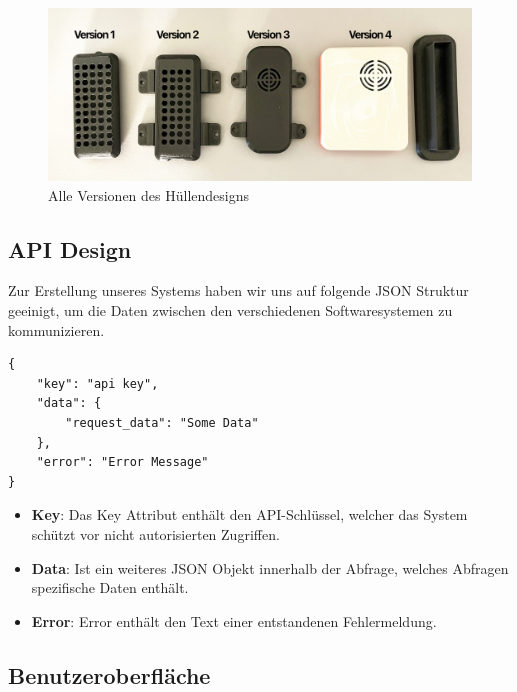 \documentclass[../main.tex]{subfiles}
\begin{document}
\begin{figure}[!ht]
    \includegraphics[width=\linewidth]{images/huellen_versionen.png}
    \caption{Alle Versionen des Hüllendesigns}
    \centering
\end{figure}

\subsection{API Design} \label{JSON-API}

Zur Erstellung unseres Systems haben wir uns auf folgende JSON Struktur geeinigt, um die Daten zwischen den verschiedenen Softwaresystemen zu kommunizieren. 

\begin{lstlisting}
{
    "key": "api key",
    "data": {
        "request_data": "Some Data"
    },
    "error": "Error Message"
}
\end{lstlisting}

\begin{itemize}
  \item\textbf{Key}: Das Key Attribut enthält den API-Schlüssel, welcher das System schützt vor nicht autorisierten Zugriffen.
  \item\textbf{Data}: Ist ein weiteres JSON Objekt innerhalb der Abfrage, welches Abfragen spezifische Daten enthält.
  \item\textbf{Error}: Error enthält den Text einer entstandenen Fehlermeldung.
\end{itemize}

\subsection{Benutzeroberfläche}
\end{document}

